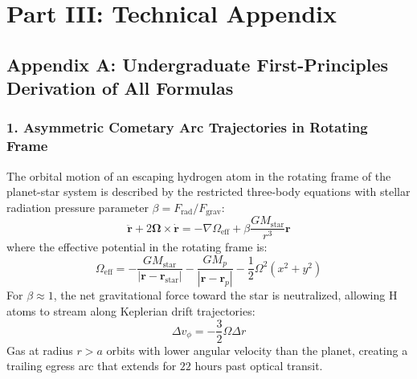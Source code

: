 \documentclass[11pt,a4paper]{article}
\begin{document}
\newpage

\section*{Part III: Technical Appendix}

\subsection*{Appendix A: Undergraduate First-Principles Derivation of All Formulas}

\subsubsection*{1. Asymmetric Cometary Arc Trajectories in Rotating Frame}
The orbital motion of an escaping hydrogen atom in the rotating frame of the planet-star system is described by the restricted three-body equations with stellar radiation pressure parameter $\beta = F_{\text{rad}} / F_{\text{grav}}$:
\begin{equation}
\ddot{\mathbf{r}} + 2 \boldsymbol{\Omega} \times \dot{\mathbf{r}} = -\nabla \Omega_{\text{eff}} + \beta \frac{G M_{\text{star}}}{r^3} \mathbf{r}
\end{equation}
where the effective potential in the rotating frame is:
\begin{equation}
\Omega_{\text{eff}} = -\frac{G M_{\text{star}}}{|\mathbf{r} - \mathbf{r}_{\text{star}}|} - \frac{G M_p}{|\mathbf{r} - \mathbf{r}_p|} - \frac{1}{2} \Omega^2 (x^2 + y^2)
\end{equation}
For $\beta \approx 1$, the net gravitational force toward the star is neutralized, allowing H atoms to stream along Keplerian drift trajectories:
\begin{equation}
\Delta v_\phi = -\frac{3}{2} \Omega \Delta r
\end{equation}
Gas at radius $r > a$ orbits with lower angular velocity than the planet, creating a trailing egress arc that extends for $22\text{ hours}$ past optical transit.
\end{document}
